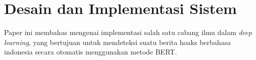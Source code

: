 \section{Desain dan Implementasi Sistem}
\label{sec:desainimplementasi}

Paper ini membahas mengenai implementasi salah satu cabang ilmu dalam \textit{deep learning}, yang bertujuan untuk mendeteksi suatu berita hoaks berbahasa indonesia secara otomatis menggunakan metode BERT.
